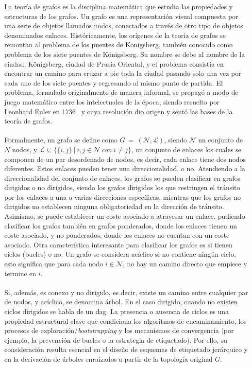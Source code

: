 La teoría de grafos es la disciplina matemática que estudia las propiedades y estructuras de los grafos. Un grafo es una representación visual compuesta por una serie de objetos llamados nodos, conectados a través de otro tipo de objetos denominados enlaces. Históricamente, los orígenes de la teoría de grafos se remontan al problema de los puentes de Königsberg, también conocido como problema de los siete puentes de Königsberg. Su nombre se debe al nombre de la ciudad, Königsberg, ciudad de Prusia Oriental, y el problema consistía en encontrar un camino para cruzar a pie toda la ciudad pasando solo una vez por cada uno de los siete puentes y regresando al mismo punto de partida. El problema, formulado originalmente de manera informal, se propagó a modo de juego matemático entre los intelectuales de la época, siendo resuelto por Leonhard Euler en 1736~\cite{euler1741solutio} y cuya resolución dio origen  y sentó las bases de la teoría de grafos.\\
\\
Formalmente, un grafo se define como $G \: = \: (\mathcal{N}, \mathcal{L})$, siendo  $\mathcal{N}$ un conjunto de $N$ nodos, y $\mathcal{L} \subseteq \{\{i,j\} \: | \: i,j \in \mathcal{N} \: con \: i \neq j\}$, un conjunto de enlaces los cuales se componen de un par desordenado de nodos, es decir, cada enlace tiene dos nodos diferentes. Estos enlaces pueden tener una direccionalidad, o no.  Atendiendo a la direccionalidad del conjunto de enlaces, los grafos se pueden clasificar en grafos dirigidos o no dirigidos, siendo los grafos dirigidos los que restringen el tránsito por los enlaces a una o varias direcciones específicas, mientras que los grafos no dirigidos no establecen ninguna obligatoriedad en la dirección de tránsito. Asimismo, se puede establecer un coste asociado a atravesar un enlace, pudiendo clasificar los grafos también en grafos ponderados, donde los enlaces tienen un coste asociado, y no ponderados, donde los enlaces no cuentan con un coste asociado. Otra característica interesante para clasificar los grafos es si tienen ciclos (bucles) o no. Un grafo se considera acíclico si no contiene ningún ciclo, esto significa que para cada nodo $i \in \mathcal{N}$, no hay un camino directo que empiece y termine en $i$.\\
\\
Si, además, es conexo y no dirigido, es decir, existe un camino entre cualquier par de nodos, y acíclico, se denomina árbol. En el caso dirigido, cuando no existen ciclos dirigidos se habla de un \gls{dag}. La presencia o ausencia de ciclos es una propiedad estructural clave que condiciona los algoritmos de encaminamiento, los procesos de exploración/\textit{bootstrapping} y los mecanismos de convergencia (por ejemplo, la prevención de bucles o la estrategia de etiquetado). Por ello, su consideración resulta esencial en el diseño de esquemas de etiquetado jerárquico y en la derivación de árboles enraizados a partir de la topología original \(G\).\\
